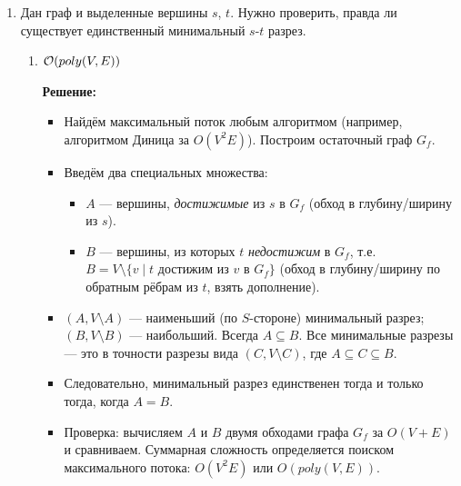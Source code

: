 \begin{enumerate}
\begin{enumerate}
\begin{itemize}
          \item Восстановление разбиения: Для каждой незасыщенной вершины $u^+ \in L$
          начинаем новый путь и жадно идём по ребрам паросочетания: если $(u^+, v^-)$ ---
          ребро паросочетания, следующая вершина пути --- $v$. Повторяем, пока цепочка не обрывается.
        \end{itemize}
    \end{enumerate}

  \item
    Дан граф и выделенные вершины $s$, $t$. Нужно проверить, правда ли существует единственный минимальный $s$-$t$ разрез.
    \begin{enumerate}
      \item $\mathcal{O}(poly(V, E))$

        \textbf{Решение:}

        \begin{itemize}
          \item Найдём максимальный поток любым алгоритмом (например, алгоритмом Диница за $O(V^2 E)$). Построим остаточный граф $G_f$.

          \item Введём два специальных множества:
          \begin{itemize}
            \item $A$ --- вершины, \emph{достижимые} из $s$ в $G_f$ (обход в глубину/ширину из $s$).
            \item $B$ --- вершины, из которых $t$ \emph{недостижим} в $G_f$, т.е.\ $B = V \setminus \{v \mid t \text{ достижим из } v \text{ в } G_f\}$ (обход в глубину/ширину по обратным рёбрам из $t$, взять дополнение).
          \end{itemize}

          \item $(A, V \setminus A)$ --- наименьший (по $S$-стороне) минимальный разрез; $(B, V \setminus B)$ --- наибольший. Всегда $A \subseteq B$. Все минимальные разрезы --- это в точности разрезы вида $(C, V \setminus C)$, где $A \subseteq C \subseteq B$.

          \item Следовательно, минимальный разрез единственен тогда и только тогда, когда $A = B$.

          \item Проверка: вычисляем $A$ и $B$ двумя обходами графа $G_f$ за $O(V + E)$ и сравниваем.
          Суммарная сложность определяется поиском максимального потока: $O(V^2 E)$ или $O(poly(V, E))$.
        \end{itemize}


\end{enumerate}
\end{enumerate}
